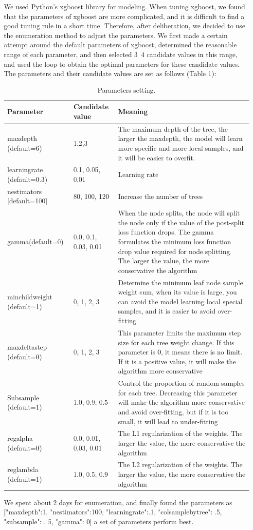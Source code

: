 \documentclass[fleqn,10pt]{wlscirep}
\newcommand{\li}{\uline{\hspace{0.5em}}}
\begin{document}
We used Python's xgboost library for modeling. When tuning xgboost, we found that the parameters of xgboost are more complicated, and it is difficult to find a good tuning rule in a short time. Therefore, after deliberation, we decided to use the enumeration method to adjust the parameters. We first made a certain attempt around the default parameters of xgboost, determined the reasonable range of each parameter, and then selected 3~4 candidate values in this range, and used the loop to obtain the optimal parameters for these candidate values. The parameters and their candidate values are set as follows (Table 1):

\begin{table}[ht]
\centering
\begin{tabular}{|p{5cm}|p{5cm}|p{5cm}|}
\hline
Parameter & Candidate value & Meaning \\
\hline
max\li depth (default=6) & 1,2,3 & The maximum depth of the tree, the larger the max\li depth, the model will learn more specific and more local samples, and it will be easier to overfit. \\
\hline
learning\li rate (default=0.3) & 0.1, 0.05, 0.01 & Learning rate\\
\hline
n\li estimators
[default=100]&
80, 100, 120&
Increase the number of trees\\
\hline
gamma(default=0)&
0.0, 0.1, 0.03, 0.01&
When the node splits, the node will split the node only if the value of the post-split loss function drops. The gamma formulates the minimum loss function drop value required for node splitting. The larger the value, the more conservative the algorithm\\
\hline
min\li child\li weight
(default=1)&
0, 1, 2, 3&
Determine the minimum leaf node sample weight sum, when its value is large, you can avoid the model learning local special samples, and it is easier to avoid over-fitting\\
\hline
max\li delta\li step
(default=0)&
0, 1, 2, 3&
This parameter limits the maximum step size for each tree weight change. If this parameter is 0, it means there is no limit. If it is a positive value, it will make the algorithm more conservative\\
\hline
Subsample
(default=1)&
1.0, 0.9, 0.5&
Control the proportion of random samples for each tree. Decreasing this parameter will make the algorithm more conservative and avoid over-fitting, but if it is too small, it will lead to under-fitting\\
\hline
reg\li alpha
(default=0)&
0.0, 0.01, 0.03, 0.01&
The L1 regularization of the weights. The larger the value, the more conservative the algorithm\\
\hline
reg\li lambda
(default=1)&
1.0, 0.5, 0.9&
The L2 regularization of the weights. The larger the value, the more conservative the algorithm\\
\hline
\end{tabular}
\caption{\label{tab:example}Parameters setting.}
\end{table}
	We spent about 2 days for enumeration, and finally found the parameters as ["max\li depth":1, "n\li estimators":100, "learning\li rate":.1, "colsample\li bytree": .5, "subsample": . 5, "gamma": 0] a set of parameters perform best.
	
\end{document}
